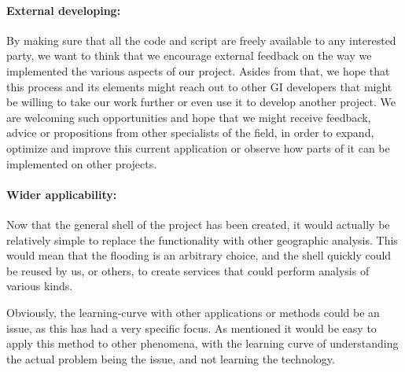 \paragraph{External developing:} By making sure that all the code and script are freely available to any interested party, we want to think that we encourage external feedback on the way we implemented the various aspects of our project. Asides from that, we hope that this process and its elements might reach out to other GI developers that might be willing to take our work further or even use it to develop another project. We are welcoming such opportunities and hope that we might receive feedback, advice or propositions from other specialists of the field, in order to expand, optimize and improve this current application or observe how parts of it can be implemented on other projects.

\paragraph{Wider applicability:} Now that the general shell of the project has been created, it would actually be relatively simple to replace the functionality with other geographic analysis. This would mean that the flooding is an arbitrary choice, and the shell quickly could be reused by us, or others, to create services that could perform analysis of various kinds.

Obviously, the learning-curve with other applications or methods could be an issue, as this has had a very specific focus. As mentioned it would be easy to apply this method to other phenomena, with the learning curve of understanding the actual problem being the issue, and not learning the technology. 